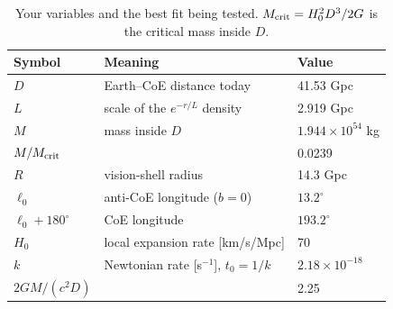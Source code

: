 \documentclass[10pt,twocolumn,letterpaper]{article}
\begin{document}
\begin{table}[h]\centering\footnotesize
\caption{Your variables and the best fit being tested. $M_{\rm crit}=H_0^2D^3/2G$ is the critical mass inside $D$.}\label{tab:vars}
\begin{tabular}{@{}lll@{}}\toprule
Symbol & Meaning & Value\\\midrule
$D$ & Earth--CoE distance today & 41.53 Gpc\\
$L$ & scale of the $e^{-r/L}$ density & 2.919 Gpc\\
$M$ & mass inside $D$ & $1.944\times10^{54}$ kg\\
$M/M_{\rm crit}$ & & 0.0239\\
$R$ & vision-shell radius & 14.3 Gpc\\
$\ell_0$ & anti-CoE longitude ($b=0$) & $13.2^\circ$\\
$\ell_0+180^\circ$ & CoE longitude & $193.2^\circ$\\
$H_0$ & local expansion rate [km/s/Mpc] & 70\\
$k$ & Newtonian rate [s$^{-1}$], $t_0=1/k$ & $2.18\times10^{-18}$\\
$2GM/(c^2D)$ & & 2.25\\\bottomrule
\end{tabular}\end{table}
\end{document}
